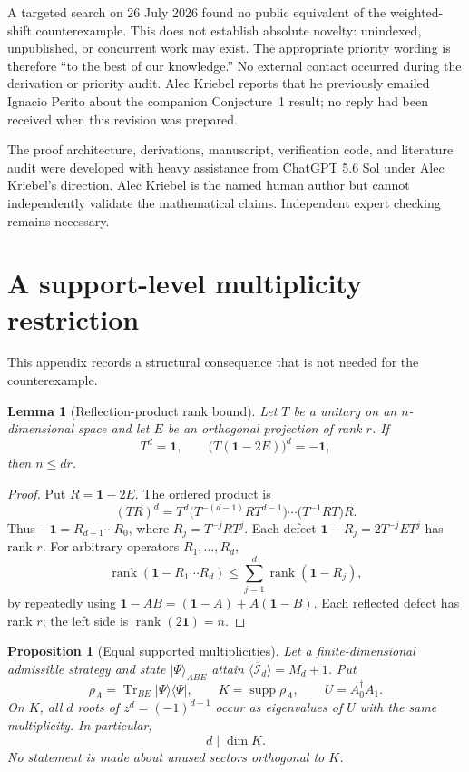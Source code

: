 \documentclass[11pt]{article}
\newtheorem{lemma}[theorem]{Lemma}
\newtheorem{proposition}[theorem]{Proposition}
\theoremstyle{remark}
\newcommand{\Id}{\mathbf 1}
\newcommand{\cI}{\mathcal I}
\newcommand{\Tr}{\operatorname{Tr}}
\newcommand{\supp}{\operatorname{supp}}
\begin{document}
A targeted search on 26 July 2026 found no public equivalent of the
weighted-shift counterexample.  This does not establish absolute novelty:
unindexed, unpublished, or concurrent work may exist.  The appropriate
priority wording is therefore ``to the best of our knowledge.''  No external
contact occurred during the derivation or priority audit.  Alec Kriebel
reports that he previously emailed Ignacio Perito about the companion
Conjecture~1 result; no reply had been received when this revision was
prepared.

The proof architecture, derivations, manuscript, verification code, and
literature audit were developed with heavy assistance from ChatGPT 5.6 Sol
under Alec Kriebel's direction.  Alec Kriebel is the named human author but
cannot independently validate the mathematical claims.  Independent expert
checking remains necessary.

\appendix
\section{A support-level multiplicity restriction}\label{app:multiplicity}

This appendix records a structural consequence that is not needed for the
counterexample.

\begin{lemma}[Reflection-product rank bound]\label{lem:reflection}
Let \(T\) be a unitary on an \(n\)-dimensional space and let \(E\) be an
orthogonal projection of rank \(r\).  If
\[
  T^d=\Id,\qquad \bigl(T(\Id-2E)\bigr)^d=-\Id,
\]
then \(n\leq dr\).
\end{lemma}

\begin{proof}
Put \(R=\Id-2E\).  The ordered product is
\[
  (TR)^d
  =
  T^d
  \bigl(T^{-(d-1)}RT^{d-1}\bigr)
  \cdots
  \bigl(T^{-1}RT\bigr)R.
\]
Thus \(-\Id=R_{d-1}\cdots R_0\), where
\(R_j=T^{-j}RT^j\).  Each defect
\(\Id-R_j=2T^{-j}ET^j\) has rank \(r\).  For arbitrary operators
\(R_1,\ldots,R_d\),
\[
  \operatorname{rank}(\Id-R_1\cdots R_d)
  \leq\sum_{j=1}^d\operatorname{rank}(\Id-R_j),
\]
by repeatedly using
\(\Id-AB=(\Id-A)+A(\Id-B)\).  Each reflected defect has rank \(r\);
the left side is \(\operatorname{rank}(2\Id)=n\).
\end{proof}

\begin{proposition}[Equal supported multiplicities]\label{prop:multiplicity}
Let a finite-dimensional admissible strategy and state
\(\lvert\Psi\rangle_{ABE}\) attain
\(\langle\overline{\cI}_d\rangle=M_d+1\).  Put
\[
  \rho_A=\Tr_{BE}\lvert\Psi\rangle\!\langle\Psi\rvert,\qquad
  K=\supp\rho_A,\qquad U=A_0^\dagger A_1.
\]
On \(K\), all \(d\) roots of \(z^d=(-1)^{d-1}\) occur as eigenvalues of
\(U\) with the same multiplicity.  In particular,
\[
  d\mid\dim K.
\]
No statement is made about unused sectors orthogonal to \(K\).
\end{proposition}
\end{document}
